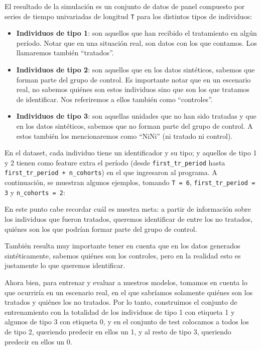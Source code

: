 \documentclass[../main.tex]{subfiles}
\begin{document}
El resultado de la simulación es un conjunto de datos de panel compuesto por series de
tiempo univariadas de longitud \texttt{T} para los distintos tipos de individuos:
\begin{itemize}
    \setlength{\itemsep}{0pt}
    \setlength{\parsep}{0pt}
    \item \textbf{Individuos de tipo 1}: son aquellos que han recibido el tratamiento en
    algún período. Notar que en una situación real, son datos con los que contamos. Los
    llamaremos también ``tratados''.
    \item \textbf{Individuos de tipo 2}: son aquellos que en los datos sintéticos, sabemos
    que forman parte del grupo de control. Es importante notar que en un escenario real,
    no sabemos quiénes son estos individuos sino que son los que tratamos de identificar.
    Nos referiremos a ellos también como ``controles''.
    \item \textbf{Individuos de tipo 3}: son aquellas unidades que no han sido tratadas y
    que en los datos sintéticos, sabemos que no forman parte del grupo de control. A estos
    también los mencionaremos como ``NiNi'' (ni tratado ni control). 
\end{itemize}

En el dataset, cada individuo tiene un identificador y su tipo; y aquellos de tipo 1 y 2
tienen como feature extra el período (desde \texttt{first\_tr\_period} hasta
\texttt{first\_tr\_period + n\_cohorts}) en el que ingresaron al programa. A continuación,
se muestran algunos ejemplos, tomando \texttt{T = 6}, \texttt{first\_tr\_period = 3} y
\texttt{n\_cohorts = 2}:

En este punto cabe recordar cuál es nuestra meta: a partir de información sobre los
individuos que fueron tratados, queremos identificar de entre los no tratados, quiénes son
los que podrían formar parte del grupo de control.

También resulta muy importante tener en cuenta que en los datos generados sintéticamente,
sabemos quiénes son los controles, pero en la realidad esto es justamente lo que queremos
identificar.

Ahora bien, para entrenar y evaluar a nuestros modelos, tomamos en cuenta lo que ocurriría
en un escenario real, en el que sabríamos solamente quiénes son los tratados y quiénes los
no tratados. Por lo tanto, construimos el conjunto de entrenamiento con la totalidad de
los individuos de tipo 1 con etiqueta 1 y algunos de tipo 3 con etiqueta 0, y en el
conjunto de test colocamos a todos los de tipo 2, queriendo predecir en ellos un 1, y al
resto de tipo 3, queriendo predecir en ellos un 0.
\end{document}

